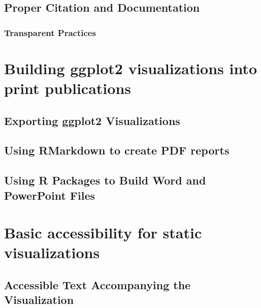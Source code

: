 \documentclass[
]{krantz}
\begin{document}
\hypertarget{proper-citation-and-documentation}{%
\section{Proper Citation and Documentation}\label{proper-citation-and-documentation}}

\hypertarget{transparent-practices}{%
\subsection{Transparent Practices}\label{transparent-practices}}

\hypertarget{print-publications}{%
\chapter{Building ggplot2 visualizations into print publications}\label{print-publications}}

\hypertarget{exporting-ggplot2-visualizations}{%
\section{Exporting ggplot2 Visualizations}\label{exporting-ggplot2-visualizations}}

\hypertarget{using-rmarkdown-to-create-pdf-reports}{%
\section{Using RMarkdown to create PDF reports}\label{using-rmarkdown-to-create-pdf-reports}}

\hypertarget{using-r-packages-to-build-word-and-powerpoint-files}{%
\section{Using R Packages to Build Word and PowerPoint Files}\label{using-r-packages-to-build-word-and-powerpoint-files}}

\hypertarget{accessibility-for-visualizations}{%
\chapter{Basic accessibility for static visualizations}\label{accessibility-for-visualizations}}

\hypertarget{accessible-text-accompanying-the-visualization}{%
\section{Accessible Text Accompanying the Visualization}\label{accessible-text-accompanying-the-visualization}}
\end{document}

